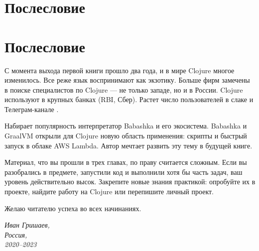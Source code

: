 
\ifprint
\chapter{Послесловие}
\else
\chapter*{Послесловие}
\fi

С момента выхода первой книги прошло два года, и в мире Clojure многое
изменилось. Все реже язык воспринимают как экзотику. Больше фирм замечены в
поиске специалистов по Clojure — не только западе, но и в России. Clojure
используют в крупных банках (RBI, Сбер). Растет число пользователей в слаке
 и Телеграм-канале
.

Набирает популярность интерпретатор Babashka и его экосистема. Babashka и
GraalVM открыли для Clojure новую область применения: скрипты и быстрый запуск в
облаке AWS Lambda. Автор мечтает развить эту тему в будущей книге.

Материал, что вы прошли в трех главах, по праву считается сложным. Если вы
разобрались в предмете, запустили код и выполнили хотя бы часть задач, ваш
уровень действительно высок. Закрепите новые знания практикой: опробуйте их в
проекте, найдите работу на Clojure или перепишите личный проект.

Желаю читателю успеха во всех начинаниях.

\vspace{1em}

\noindent

\hspace{\fill}\parbox{4cm}{\textit{Иван Гришаев,\\Россия,\\2020--2023}}
